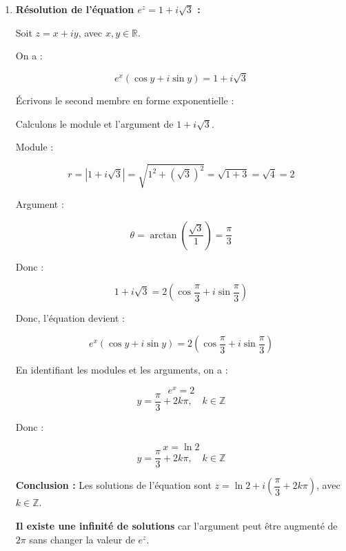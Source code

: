 \documentclass[a4paper,12pt]{article}
\begin{document}
\begin{solutionbox}
\begin{enumerate}
    \[
    e^{2 + 3i} \approx e^{2} ( -0.9900 + i \times 0.1411 ) \approx e^{2} ( -0.9900 + 0.1411 i )
    \]

    Calculons \( e^{2} \approx 7.3891 \)

    Donc :

    \[
    e^{2 + 3i} \approx 7.3891 ( -0.9900 + 0.1411 i ) \approx -7.306 + 1.043 i
    \]

    \textbf{Conclusion :} \( e^{2 + 3i} \approx -7.306 + 1.043 i \)

    \item \textbf{Résolution de l'équation \( e^{z} = 1 + i\sqrt{3} \) :}

    Soit \( z = x + i y \), avec \( x, y \in \mathbb{R} \).

    On a :

    \[
    e^{x} (\cos y + i \sin y) = 1 + i\sqrt{3}
    \]

    Écrivons le second membre en forme exponentielle :

    Calculons le module et l'argument de \( 1 + i\sqrt{3} \).

    Module :

    \[
    r = |1 + i\sqrt{3}| = \sqrt{1^2 + (\sqrt{3})^2} = \sqrt{1 + 3} = \sqrt{4} = 2
    \]

    Argument :

    \[
    \theta = \arctan\left( \dfrac{\sqrt{3}}{1} \right) = \dfrac{\pi}{3}
    \]

    Donc :

    \[
    1 + i\sqrt{3} = 2 \left( \cos \dfrac{\pi}{3} + i \sin \dfrac{\pi}{3} \right)
    \]

    Donc, l'équation devient :

    \[
    e^{x} (\cos y + i \sin y) = 2 \left( \cos \dfrac{\pi}{3} + i \sin \dfrac{\pi}{3} \right)
    \]

    En identifiant les modules et les arguments, on a :

    \[
    e^{x} = 2
    \]
    \[
    y = \dfrac{\pi}{3} + 2k\pi, \quad k \in \mathbb{Z}
    \]

    Donc :

    \[
    x = \ln 2
    \]
    \[
    y = \dfrac{\pi}{3} + 2k\pi, \quad k \in \mathbb{Z}
    \]

    \textbf{Conclusion :} Les solutions de l'équation sont \( z = \ln 2 + i \left( \dfrac{\pi}{3} + 2k\pi \right) \), avec \( k \in \mathbb{Z} \).

    \textbf{Il existe une infinité de solutions} car l'argument peut être augmenté de \( 2\pi \) sans changer la valeur de \( e^{z} \).

\end{enumerate}
\end{solutionbox}
\end{document}
